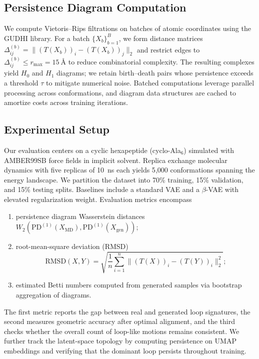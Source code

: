 \documentclass[11pt]{article}
\theoremstyle{definition}
\begin{document}
\subsection{Persistence Diagram Computation}
We compute Vietoris--Rips filtrations on batches of atomic coordinates using the GUDHI library. For a batch $\{X_b\}_{b=1}^B$, we form distance matrices $\Delta^{(b)}_{ij} = \| (T(X_b))_i - (T(X_b))_j \|_2$ and restrict edges to $\Delta^{(b)}_{ij} \leq r_{\max} = 15~\text{\AA}$ to reduce combinatorial complexity. The resulting complexes yield $H_0$ and $H_1$ diagrams; we retain birth--death pairs whose persistence exceeds a threshold $\tau$ to mitigate numerical noise. Batched computations leverage parallel processing across conformations, and diagram data structures are cached to amortize costs across training iterations.

\subsection{Experimental Setup}
Our evaluation centers on a cyclic hexapeptide (cyclo-Ala$_6$) simulated with AMBER99SB force fields in implicit solvent. Replica exchange molecular dynamics with five replicas of 10~ns each yields 5{,}000 conformations spanning the energy landscape. We partition the dataset into 70\% training, 15\% validation, and 15\% testing splits. Baselines include a standard VAE and a $\beta$-VAE with elevated regularization weight. Evaluation metrics encompass
\begin{enumerate}[label=\roman*)]
    \item persistence diagram Wasserstein distances $W_{2}(\mathrm{PD}^{(1)}(X_{\text{MD}}), \mathrm{PD}^{(1)}(X_{\text{gen}}))$;
    \item root-mean-square deviation (RMSD)
    \begin{equation}
        \mathrm{RMSD}(X, Y) = \sqrt{\frac{1}{n} \sum_{i=1}^n \big\| (T(X))_i - (T(Y))_i \big\|_2^2};
        \label{eq:rmsd}
    \end{equation}
    \item estimated Betti numbers computed from generated samples via bootstrap aggregation of diagrams.
\end{enumerate}
The first metric reports the gap between real and generated loop signatures, the second measures geometric accuracy after optimal alignment, and the third checks whether the overall count of loop-like motions remains consistent. We further track the latent-space topology by computing persistence on UMAP embeddings and verifying that the dominant loop persists throughout training.
\end{document}
